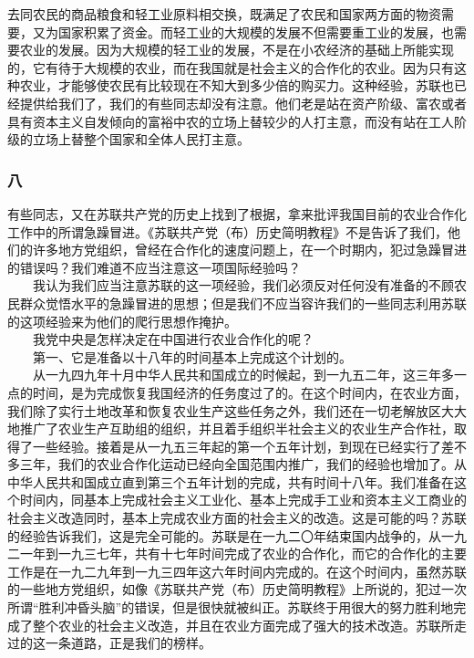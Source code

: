 \documentclass[cn,11pt,chinese]{elegantbook}
\def\myformat#1{\hfil\hfil #1}
\begin{document}
去同农民的商品粮食和轻工业原料相交换，既满足了农民和国家两方面的物资需要，又为国家积累了资金。而轻工业的大规模的发展不但需要重工业的发展，也需要农业的发展。因为大规模的轻工业的发展，不是在小农经济的基础上所能实现的，它有待于大规模的农业，而在我国就是社会主义的合作化的农业。因为只有这种农业，才能够使农民有比较现在不知大到多少倍的购买力。这种经验，苏联也已经提供给我们了，我们的有些同志却没有注意。他们老是站在资产阶级、富农或者具有资本主义自发倾向的富裕中农的立场上替较少的人打主意，而没有站在工人阶级的立场上替整个国家和全体人民打主意。\\
\subsubsection*{\myformat{八}}
有些同志，又在苏联共产党的历史上找到了根据，拿来批评我国目前的农业合作化工作中的所谓急躁冒进。《苏联共产党（布）历史简明教程》不是告诉了我们，他们的许多地方党组织，曾经在合作化的速度问题上，在一个时期内，犯过急躁冒进的错误吗？我们难道不应当注意这一项国际经验吗？\\
　　我认为我们应当注意苏联的这一项经验，我们必须反对任何没有准备的不顾农民群众觉悟水平的急躁冒进的思想；但是我们不应当容许我们的一些同志利用苏联的这项经验来为他们的爬行思想作掩护。\\
　　我党中央是怎样决定在中国进行农业合作化的呢？\\
　　第一、它是准备以十八年的时间基本上完成这个计划的。\\
　　从一九四九年十月中华人民共和国成立的时候起，到一九五二年，这三年多一点的时间，是为完成恢复我国经济的任务度过了的。在这个时间内，在农业方面，我们除了实行土地改革和恢复农业生产这些任务之外，我们还在一切老解放区大大地推广了农业生产互助组的组织，并且着手组织半社会主义的农业生产合作社，取得了一些经验。接着是从一九五三年起的第一个五年计划，到现在已经实行了差不多三年，我们的农业合作化运动已经向全国范围内推广，我们的经验也增加了。从中华人民共和国成立直到第三个五年计划的完成，共有时间十八年。我们准备在这个时间内，同基本上完成社会主义工业化、基本上完成手工业和资本主义工商业的社会主义改造同时，基本上完成农业方面的社会主义的改造。这是可能的吗？苏联的经验告诉我们，这是完全可能的。苏联是在一九二〇年结束国内战争的，从一九二一年到一九三七年，共有十七年时间完成了农业的合作化，而它的合作化的主要工作是在一九二九年到一九三四年这六年时间内完成的。在这个时间内，虽然苏联的一些地方党组织，如像《苏联共产党（布）历史简明教程》上所说的，犯过一次所谓“胜利冲昏头脑”的错误，但是很快就被纠正。苏联终于用很大的努力胜利地完成了整个农业的社会主义改造，并且在农业方面完成了强大的技术改造。苏联所走过的这一条道路，正是我们的榜样。\\
\end{document}
